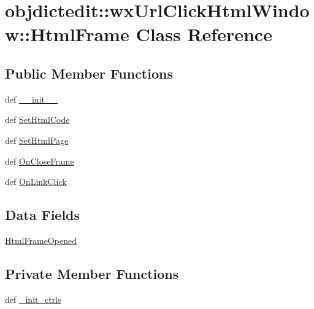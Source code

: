 \hypertarget{classobjdictedit_1_1wxUrlClickHtmlWindow_1_1HtmlFrame}{
\section{objdictedit::wx\-Url\-Click\-Html\-Window::Html\-Frame Class Reference}
\label{classobjdictedit_1_1wxUrlClickHtmlWindow_1_1HtmlFrame}
}
\subsection*{Public Member Functions}
\begin{CompactItemize}
\item 
def \hyperlink{classobjdictedit_1_1wxUrlClickHtmlWindow_1_1HtmlFrame_c3eab7be0bc1afb27171837c712da89d}{\_\-\_\-init\_\-\_\-}
\item 
def \hyperlink{classobjdictedit_1_1wxUrlClickHtmlWindow_1_1HtmlFrame_375043f928e987f104763ad6e3d118be}{Set\-Html\-Code}
\item 
def \hyperlink{classobjdictedit_1_1wxUrlClickHtmlWindow_1_1HtmlFrame_d55f13d2f73906fb8891fd8ab6282897}{Set\-Html\-Page}
\item 
def \hyperlink{classobjdictedit_1_1wxUrlClickHtmlWindow_1_1HtmlFrame_5cadc14f91eaeef5c2e001ccdf408264}{On\-Close\-Frame}
\item 
def \hyperlink{classobjdictedit_1_1wxUrlClickHtmlWindow_1_1HtmlFrame_bf60307dc144170d58195467361d5aa4}{On\-Link\-Click}
\end{CompactItemize}
\subsection*{Data Fields}
\begin{CompactItemize}
\item 
\hyperlink{classobjdictedit_1_1wxUrlClickHtmlWindow_1_1HtmlFrame_1eafdd26ade3a7888626bee2f19a5ce4}{Html\-Frame\-Opened}
\end{CompactItemize}
\subsection*{Private Member Functions}
\begin{CompactItemize}
\item 
def \hyperlink{classobjdictedit_1_1wxUrlClickHtmlWindow_1_1HtmlFrame_ab7f53a3b3ff1fd9cfe56023b159a40e}{\_\-init\_\-ctrls}
\end{CompactItemize}



